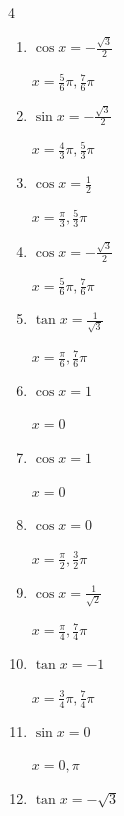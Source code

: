 \begin{multicols}{4}
\begin{enumerate}
  \item $\displaystyle \cos{x}  = -\frac{\sqrt{3}}{2}$

        $\displaystyle x = \frac{5}{6}\pi , \frac{7}{6}\pi$

  \item $\displaystyle \sin{x}  = -\frac{\sqrt{3}}{2}$

        $\displaystyle x = \frac{4}{3}\pi , \frac{5}{3}\pi$

  \item $\displaystyle \cos{x}  = \frac{1}{2}$

        $\displaystyle x = \frac{\pi}{3} , \frac{5}{3}\pi$

  \item $\displaystyle \cos{x}  = -\frac{\sqrt{3}}{2}$

        $\displaystyle x = \frac{5}{6}\pi , \frac{7}{6}\pi$

  \item $\displaystyle \tan{x}  = \frac{1}{\sqrt{3}}$

        $\displaystyle x = \frac{\pi}{6} , \frac{7}{6}\pi$

  \item $\displaystyle \cos{x}  = 1$

        $\displaystyle x = 0$

  \item $\displaystyle \cos{x}  = 1$

        $\displaystyle x = 0$

  \item $\displaystyle \cos{x}  = 0$

        $\displaystyle x = \frac{\pi}{2} , \frac{3}{2}\pi$

  \item $\displaystyle \cos{x}  = \frac{1}{\sqrt{2}}$

        $\displaystyle x = \frac{\pi}{4} , \frac{7}{4}\pi$

\columnbreak %

  \item $\displaystyle \tan{x}  = -1$

        $\displaystyle x = \frac{3}{4}\pi , \frac{7}{4}\pi$

  \item $\displaystyle \sin{x}  = 0$

        $\displaystyle x = 0 , \pi$

  \item $\displaystyle \tan{x}  = -\sqrt{3}$


\end{enumerate}
\end{multicols}
